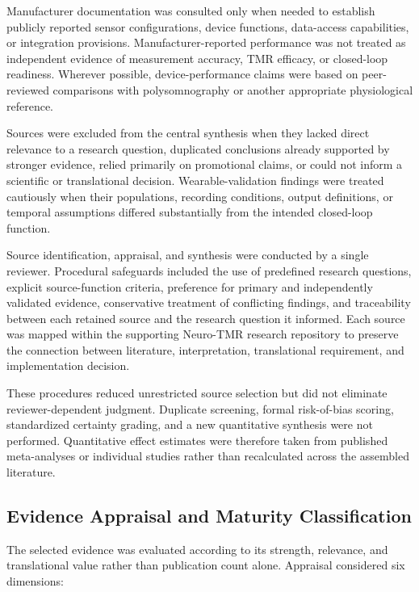Manufacturer documentation was consulted only when needed to establish publicly
reported sensor configurations, device functions, data-access capabilities, or
integration provisions. Manufacturer-reported performance was not treated as
independent evidence of measurement accuracy, TMR efficacy, or closed-loop
readiness. Wherever possible, device-performance claims were based on
peer-reviewed comparisons with polysomnography or another appropriate
physiological reference.

Sources were excluded from the central synthesis when they lacked direct
relevance to a research question, duplicated conclusions already supported by
stronger evidence, relied primarily on promotional claims, or could not inform a
scientific or translational decision. Wearable-validation findings were treated
cautiously when their populations, recording conditions, output definitions, or
temporal assumptions differed substantially from the intended closed-loop
function.

Source identification, appraisal, and synthesis were conducted by a single
reviewer. Procedural safeguards included the use of predefined research
questions, explicit source-function criteria, preference for primary and
independently validated evidence, conservative treatment of conflicting
findings, and traceability between each retained source and the research
question it informed. Each source was mapped within the supporting Neuro-TMR
research repository to preserve the connection between literature,
interpretation, translational requirement, and implementation decision.

These procedures reduced unrestricted source selection but did not eliminate
reviewer-dependent judgment. Duplicate screening, formal risk-of-bias scoring,
standardized certainty grading, and a new quantitative synthesis were not
performed. Quantitative effect estimates were therefore taken from published
meta-analyses or individual studies rather than recalculated across the assembled
literature.


\subsection{Evidence Appraisal and Maturity Classification}

The selected evidence was evaluated according to its strength, relevance, and
translational value rather than publication count alone. Appraisal considered
six dimensions:

